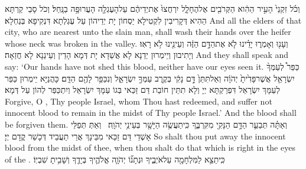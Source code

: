 {וְכֹ֗ל זִקְנֵי֙ הָעִ֣יר הַהִ֔וא הַקְּרֹבִ֖ים אֶל\maqqaf הֶחָלָ֑ל יִרְחֲצוּ֙ אֶת\maqqaf יְדֵיהֶ֔ם עַל\maqqaf הָעֶגְלָ֖ה הָעֲרוּפָ֥ה בַנָּֽחַל׃}
{וְכֹל סָבֵי קַרְתָּא הַהִיא דְּקָרִיבִין לִקְטִילָא יַסְחוֹן יָת יְדֵיהוֹן עַל עֶגְלְתָא דִּנְקִיפָא בְּנַחְלָא׃}
{And all the elders of that city, who are nearest unto the slain man, shall wash their hands over the heifer whose neck was broken in the valley.}{}
{וְעָנ֖וּ וְאָמְר֑וּ יָדֵ֗ינוּ לֹ֤א  אֶת\maqqaf הַדָּ֣ם הַזֶּ֔ה וְעֵינֵ֖ינוּ לֹ֥א רָאֽוּ׃}
{וְיָתִיבוּן וְיֵימְרוּן יְדַנָא לָא אֲשַׁדָא יָת דְּמָא הָדֵין וְעֵינַנָא לָא חֲזַאָה׃}
{And they shall speak and say: ‘Our hands have not shed this blood, neither have our eyes seen it.}{}
{כַּפֵּר֩ לְעַמְּךָ֨ יִשְׂרָאֵ֤ל אֲשֶׁר\maqqaf פָּדִ֙יתָ֙ יְהֹוָ֔ה וְאַל\maqqaf תִּתֵּן֙ דָּ֣ם נָקִ֔י בְּקֶ֖רֶב עַמְּךָ֣ יִשְׂרָאֵ֑ל וְנִכַּפֵּ֥ר לָהֶ֖ם הַדָּֽם׃}
{כָּהֲנַיָּא יֵימְרוּן כַּפַּר לְעַמָּךְ יִשְׂרָאֵל דִּפְרַקְתָּא יְיָ וְלָא תִתֵּין חוֹבַת דַּם זַכַּאי בְּגוֹ עַמָּךְ יִשְׂרָאֵל וְיִתְכַּפַּר לְהוֹן עַל דְּמָא׃}
{Forgive, O \lord, Thy people Israel, whom Thou hast redeemed, and suffer not innocent blood to remain in the midst of Thy people Israel.’ And the blood shall be forgiven them.}{}
{וְאַתָּ֗ה תְּבַעֵ֛ר הַדָּ֥ם הַנָּקִ֖י מִקִּרְבֶּ֑ךָ כִּֽי\maqqaf תַעֲשֶׂ֥ה הַיָּשָׁ֖ר בְּעֵינֵ֥י יְהֹוָֽה׃ \setuma }
{וְאַתְּ תְּפַלֵּי אָשְׁדֵי דַּם זַכַּאי מִבֵּינָךְ אֲרֵי תַעֲבֵיד דְּכָשַׁר קֳדָם יְיָ׃}
{So shalt thou put away the innocent blood from the midst of thee, when thou shalt do that which is right in the eyes of the \lord.}{}
{כִּֽי\maqqaf תֵצֵ֥א לַמִּלְחָמָ֖ה עַל\maqqaf אֹיְבֶ֑יךָ וּנְתָנ֞וֹ יְהֹוָ֧ה אֱלֹהֶ֛יךָ בְּיָדֶ֖ךָ וְשָׁבִ֥יתָ שִׁבְיֽוֹ׃}
